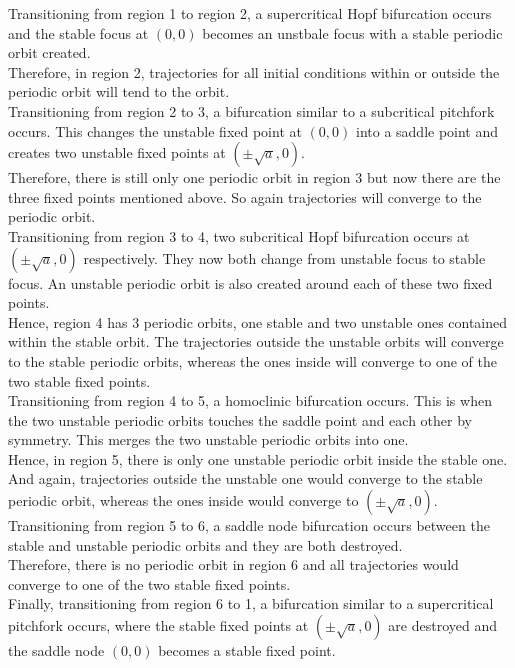 \documentclass[10pt]{article}
\begin{document}
Transitioning from region 1 to region 2, a supercritical Hopf bifurcation occurs and the stable focus at $(0,0)$ becomes an unstbale focus with a stable periodic orbit created.\\
Therefore, in region 2, trajectories for all initial conditions within or outside the periodic orbit will tend to the orbit. \\
Transitioning from region 2 to 3, a bifurcation similar to a subcritical pitchfork occurs. This changes the unstable fixed point at $(0,0)$ into a saddle point and creates two unstable fixed points at $(\pm\sqrt{a},0)$.\\
Therefore, there is still only one periodic orbit in region 3 but now there are the three fixed points mentioned above. So again trajectories will converge to the periodic orbit.\\
Transitioning from region 3 to 4, two subcritical Hopf bifurcation occurs at $(\pm\sqrt{a},0)$ respectively. They now both change from unstable focus to stable focus. An unstable periodic orbit is also created around each of these two fixed points.\\
Hence, region 4 has 3 periodic orbits, one stable and two unstable ones contained within the stable orbit. The trajectories outside the unstable orbits will converge to the stable periodic orbits, whereas the ones inside will converge to one of the two stable fixed points.\\
Transitioning from region 4 to 5, a homoclinic bifurcation occurs. This is when the two unstable periodic orbits touches the saddle point and each other by symmetry. This merges the two unstable periodic orbits into one.\\
Hence, in region 5, there is only one unstable periodic orbit inside the stable one. And again, trajectories outside the unstable one would converge to the stable periodic orbit, whereas the ones inside would converge to $(\pm\sqrt{a},0)$.\\
Transitioning from region 5 to 6, a saddle node bifurcation occurs between the stable and unstable periodic orbits and they are both destroyed.\\
Therefore, there is no periodic orbit in region 6 and all trajectories would converge to one of the two stable fixed points.\\
Finally, transitioning from region 6 to 1, a bifurcation similar to a supercritical pitchfork occurs, where the stable fixed points at $(\pm\sqrt{a},0)$ are destroyed and the saddle node $(0,0)$ becomes a stable fixed point.
\end{document}
